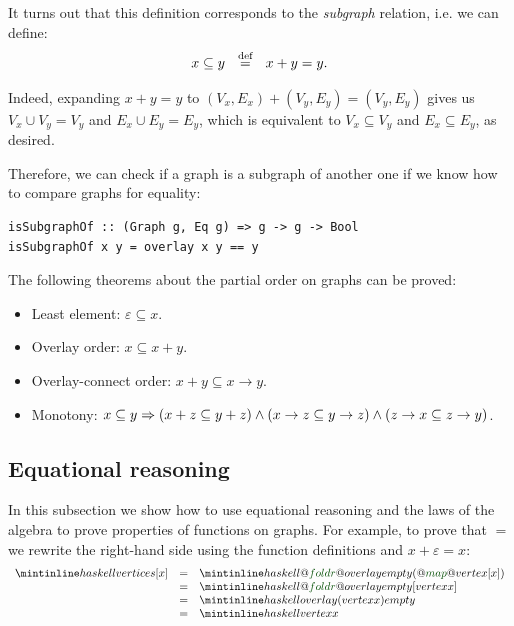 \noindent
It turns out that this definition corresponds to the \emph{subgraph} relation,
i.e. we can define:
\[
x \subseteq y~~\stackrel{\text{def}}{=}~~x + y = y.
\]

\noindent
Indeed, expanding $x + y = y$ to $(V_x,E_x) + (V_y,E_y) = (V_y,E_y)$ gives us
$V_x \cup V_y = V_y$ and $E_x \cup E_y = E_y$, which is equivalent to
$V_x \subseteq V_y$ and $E_x \subseteq E_y$, as desired.

Therefore, we can check if a graph is a subgraph of another one if we know how to
compare graphs for equality:
\begin{verbatim}
isSubgraphOf :: (Graph g, Eq g) => g -> g -> Bool
isSubgraphOf x y = overlay x y == y
\end{verbatim}

The following theorems about the partial order on graphs can be proved:

\begin{itemize}
    \item Least element: $\varepsilon \subseteq x$.
    \item Overlay order: $x \subseteq x + y$.
    \item Overlay-connect order: $x + y \subseteq x \rightarrow y$.
    \item Monotony: $x \subseteq y \Rightarrow \\
    (x + z \subseteq y + z) \wedge(x \rightarrow z \subseteq y \rightarrow z)
    \wedge (z \rightarrow x \subseteq z \rightarrow y)$.

\end{itemize}

\subsection{Equational reasoning}\label{sub-reasoning}

In this subsection we show how to use equational reasoning and the laws
of the algebra to prove properties of functions on graphs.
For example, to prove that  $=$  we rewrite
the right-hand side using the function definitions and $x + \varepsilon = x$:
\[
\begin{array}{rcl}
\hs{vertices [x]} & = & \hs{@\std{foldr}@ overlay empty (@\std{map}@ vertex [x])}\\
 & = & \hs{@\std{foldr}@ overlay empty [vertex x]}\\
 & = & \hs{overlay (vertex x) empty}\\
 & = & \hs{vertex x}\\
\end{array}
\]

